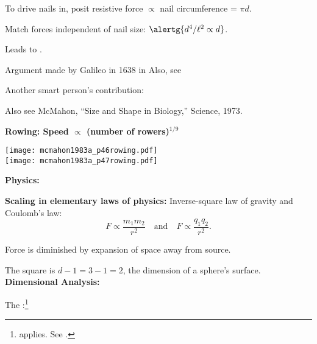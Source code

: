       To drive nails in, posit resistive force $\propto$ nail circumference = $\pi d$.
    
      Match forces independent of nail size: $\alertg{d^4/\ell^2 \propto d}$.
    
      Leads to .
    
      Argument made by Galileo\cite{galilei1638a} in 1638 in
      Also, see 
    
      Another smart person's contribution: 
    
      Also see McMahon, ``Size and Shape in Biology,'' Science, 1973.\cite{mcmahon1973a}

  \textbf{Rowing: Speed $\propto $ (number of rowers)$^{1/9}$}
    \begin{center}
      \texttt{[image: mcmahon1983a\_p46rowing.pdf]} \\
      \texttt{[image: mcmahon1983a\_p47rowing.pdf]}
    \end{center}
  \textbf{Physics:}

  \textbf{Scaling in elementary laws of physics:}
      Inverse-square law of gravity
      and Coulomb's law: 
      $$
      F 
      \propto 
      \frac{m_1 m_2}{r^{2}}
      \quad 
      \mbox{and} 
      \quad
      F 
      \propto 
      \frac{q_1 q_2}{r^{2}}.
      $$
     
      Force is diminished by expansion of space away from source.  
     
      The square is $d-1=3-1=2$, the dimension of
      a sphere's surface.
  \textbf{Dimensional Analysis:}

  The 
  :\footnote{ applies.
    See .
  }

  \medskip


